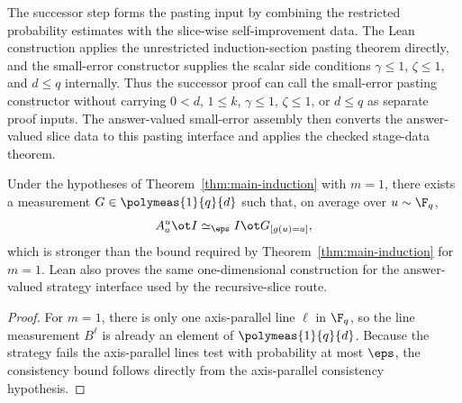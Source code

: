 \begin{definition}\label{def:successor-pasting-data}
	\leanok
	The successor step forms the pasting input by combining the restricted
	probability estimates with the slice-wise self-improvement data.  The Lean
	construction applies the unrestricted induction-section pasting theorem directly,
	and the small-error constructor supplies the scalar side conditions
	\(\gamma\le 1\), \(\zeta\le 1\), and \(d\le q\) internally.  Thus the
	successor proof can call the small-error pasting constructor without carrying
	\(0<d\), \(1\le k\), \(\gamma\le 1\), \(\zeta\le 1\), or \(d\le q\) as
	separate proof inputs.  The answer-valued small-error assembly then converts
	the answer-valued slice data to this pasting interface and applies the
	checked stage-data theorem.
\end{definition}

\begin{lemma}\label{lem:main-induction-base}
	\leanok
	Under the hypotheses of Theorem~\ref{thm:main-induction} with $m=1$, there exists a measurement $G \in \polymeas{1}{q}{d}$ such that, on average over $u \sim \F_q$,
	\[
		A_a^u \ot I \simeq_\eps I \ot G_{[g(u)=a]},
	\]
	which is stronger than the bound required by Theorem~\ref{thm:main-induction} for $m=1$.
	Lean also proves the same one-dimensional construction for the
	answer-valued strategy interface used by the recursive-slice route.
\end{lemma}
\begin{proof}
	\leanok
	For $m=1$, there is only one axis-parallel line $\ell$ in $\F_q$, so the line measurement $B^\ell$ is already an element of $\polymeas{1}{q}{d}$. Because the strategy fails the axis-parallel lines test with probability at most $\eps$, the consistency bound follows directly from the axis-parallel consistency hypothesis.
\end{proof}

